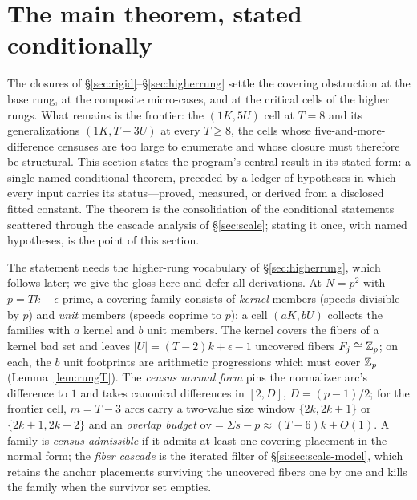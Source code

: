 
\section{The main theorem, stated conditionally}\label{sec:SC}

The closures of \S\ref{sec:rigid}--\S\ref{sec:higherrung} settle the
covering obstruction at the base rung, at the composite micro-cases, and
at the critical cells of the higher rungs. What remains is the frontier:
the $(1K,5U)$ cell at $T=8$ and its generalizations $(1K,T{-}3U)$ at
every $T\ge 8$, the cells whose five-and-more-difference censuses are too
large to enumerate and whose closure must therefore be structural. This
section states the program's central result in its stated form:
a single named conditional theorem, preceded by a ledger of
hypotheses in which every input carries its status---proved, measured,
or derived from a disclosed fitted constant. The theorem is the
consolidation of the conditional statements scattered through the
cascade analysis of \S\ref{sec:scale}; stating it once, with named
hypotheses, is the point of this section.

The statement needs the higher-rung vocabulary of
\S\ref{sec:higherrung}, which follows later; we give the gloss here and
defer all derivations. At $N=p^2$ with $p=Tk+\epsilon$ prime, a covering
family consists of \emph{kernel} members (speeds divisible by $p$) and
\emph{unit} members (speeds coprime to $p$); a cell $(aK,bU)$ collects
the families with $a$ kernel and $b$ unit members. The kernel covers the
fibers of a kernel bad set and leaves $|U|=(T-2)k+\epsilon-1$ uncovered
fibers $F_j\cong\mathbb{Z}_p$; on each, the $b$ unit footprints are arithmetic
progressions which must cover $\mathbb{Z}_p$ (Lemma~\ref{lem:rungT}). The
\emph{census normal form} pins the normalizer arc's difference to $1$
and takes canonical differences in $[2,D]$, $D=(p-1)/2$; for the
frontier cell, $m=T-3$ arcs carry a two-value size window
$\{2k,2k+1\}$ or $\{2k+1,2k+2\}$ and an \emph{overlap budget}
$\mathrm{ov}=\Sigma s-p\approx(T-6)k+O(1)$. A family is
\emph{census-admissible} if it admits at least one covering placement in
the normal form; the \emph{fiber cascade} is the iterated filter of
\S\ref{si:sec:scale-model}, which retains the anchor placements surviving
the uncovered fibers one by one and kills the family when the survivor
set empties.

